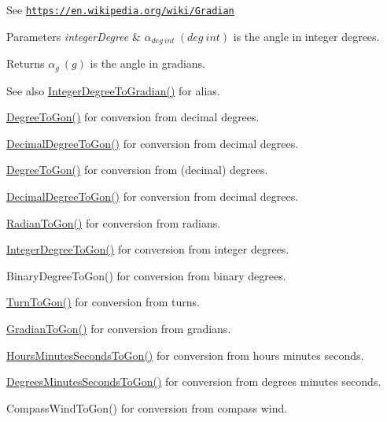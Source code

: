 See \href{https://en.wikipedia.org/wiki/Gradian}{\tt https\+://en.\+wikipedia.\+org/wiki/\+Gradian} 
\begin{DoxyParams}{Parameters}
{\em integer\+Degree} & $\alpha_{deg\ int}\ (deg\ int)$ is the angle in integer degrees. \\
\hline
\end{DoxyParams}
\begin{DoxyReturn}{Returns}
$\alpha_{g}\ (g)$ is the angle in gradians. 
\end{DoxyReturn}
\begin{DoxySeeAlso}{See also}
\mbox{\hyperlink{group___e_g_x_math-_angle_conversions-_integer_degree_ga47127467ff7a8ef57f6be9ce496a97df}{Integer\+Degree\+To\+Gradian()}} for alias. 

\mbox{\hyperlink{group___e_g_x_math-_angle_conversions-_degree_ga87c3fab0867021e5d2501197b4db6194}{Degree\+To\+Gon()}} for conversion from decimal degrees. 

\mbox{\hyperlink{group___e_g_x_math-_angle_conversions-_decimal_degree_gaeb333a1ad0aeb913c025fbd1be85fcb3}{Decimal\+Degree\+To\+Gon()}} for conversion from decimal degrees. 

\mbox{\hyperlink{group___e_g_x_math-_angle_conversions-_degree_ga87c3fab0867021e5d2501197b4db6194}{Degree\+To\+Gon()}} for conversion from (decimal) degrees. 

\mbox{\hyperlink{group___e_g_x_math-_angle_conversions-_decimal_degree_gaeb333a1ad0aeb913c025fbd1be85fcb3}{Decimal\+Degree\+To\+Gon()}} for conversion from decimal degrees. 

\mbox{\hyperlink{group___e_g_x_math-_angle_conversions-_radian_ga36912e5a810b64c271c4dafc17f4ca45}{Radian\+To\+Gon()}} for conversion from radians. 

\mbox{\hyperlink{group___e_g_x_math-_angle_conversions-_integer_degree_ga6e5be425c37ad27319f09329156c64bb}{Integer\+Degree\+To\+Gon()}} for conversion from integer degrees. 

Binary\+Degree\+To\+Gon() for conversion from binary degrees. 

\mbox{\hyperlink{group___e_g_x_math-_angle_conversions-_turn_gad81dd0bb1660ef24e28fa15b2403dec7}{Turn\+To\+Gon()}} for conversion from turns. 

\mbox{\hyperlink{group___e_g_x_math-_angle_conversions-_gradian_gaff399262b6c8455e450e0a9dc8eb2ad1}{Gradian\+To\+Gon()}} for conversion from gradians. 

\mbox{\hyperlink{group___e_g_x_math-_angle_conversions-_hours_minutes_seconds_ga356f1e89c3ea35a9d46967644d4ddfd3}{Hours\+Minutes\+Seconds\+To\+Gon()}} for conversion from hours minutes seconds. 

\mbox{\hyperlink{group___e_g_x_math-_angle_conversions-_degrees_minutes_seconds_ga90b481c224ad083726ffe0fd35f4dbfc}{Degrees\+Minutes\+Seconds\+To\+Gon()}} for conversion from degrees minutes seconds. 

Compass\+Wind\+To\+Gon() for conversion from compass wind. 
\end{DoxySeeAlso}
